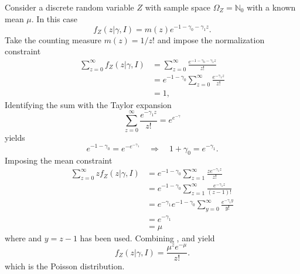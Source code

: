 \begin{example}
	Consider a discrete random variable $Z$ with sample space $\Omega_Z = \mathbb{N}_0$ with a known mean $\mu$. In this case
	\begin{equation}
		f_Z(z|\gamma,I) = m(z) e^{-1-\gamma_0 - \gamma_1 z}.
		\label{eq:qsa}
	\end{equation}
	Take the counting measure $m(z) = 1/z!$ and impose the normalization constraint
	\begin{equation}
		\begin{split}
			\sum_{z=0}^{\infty} f_Z(z|\gamma,I) &= \sum_{z=0}^{\infty} \frac{e^{-1-\gamma_0 - \gamma_1 z}}{z!}\\
			& = e^{-1-\gamma_0} \sum_{z=0}^{\infty} \frac{e^{-\gamma_1 z}}{z!}\\
			& = 1,
		\end{split}
		\label{eq:asd}
	\end{equation}
	Identifying the sum with the Taylor expansion
	\begin{equation}
		\sum_{z=0}^{\infty} \frac{e^{-\gamma_1 z}}{z!} = e^{e^{-\gamma}}
	\end{equation}
	yields
	\begin{equation}
		e^{-1-\gamma_0} = e^{-e^{-\gamma_1}} \quad \Rightarrow \quad 1+\gamma_0 = e^{-\gamma_1}.
		\label{eq:qwe}
	\end{equation}
	Imposing the mean constraint
	\begin{equation}
		\begin{split}
			\sum_{z=0}^{\infty} z f_Z(z|\gamma,I)& = e^{-1-\gamma_0} \sum_{z=1}^{\infty} \frac{z e^{-\gamma_1 z}}{z!}\\
			& = e^{-1-\gamma_0} \sum_{z=1}^{\infty} \frac{e^{-\gamma_1 z}}{(z-1)!}\\
			& = e^{-\gamma_1} e^{-1-\gamma_0}\sum_{y=0}^{\infty} \frac{e^{-\gamma_1 y}}{y!}\\
			& = e^{-\gamma_1}\\
			& = \mu
		\end{split}
		\label{eq:qty}
	\end{equation}
	where  and $y = z-1$ has been used. Combining ,  and  yield
	\begin{equation}
		f_Z(z|\gamma,I) = \frac{\mu^ze^{-\mu }}{z!} .
	\end{equation}
	which is the Poisson distribution.
\end{example}



